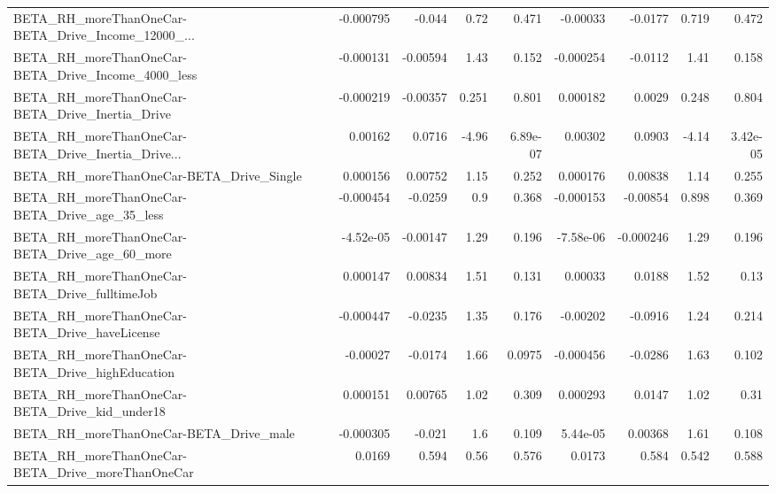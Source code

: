 \begin{tabular}{lrrrrrrrr}
BETA\_RH\_moreThanOneCar-BETA\_Drive\_Income\_12000\_... &   -0.000795 &       -0.044 &     0.72 &    0.471 &   -0.00033 &     -0.0177 &        0.719 &         0.472 \\
BETA\_RH\_moreThanOneCar-BETA\_Drive\_Income\_4000\_less &   -0.000131 &     -0.00594 &     1.43 &    0.152 &  -0.000254 &     -0.0112 &         1.41 &         0.158 \\
BETA\_RH\_moreThanOneCar-BETA\_Drive\_Inertia\_Drive    &   -0.000219 &     -0.00357 &    0.251 &    0.801 &   0.000182 &      0.0029 &        0.248 &         0.804 \\
BETA\_RH\_moreThanOneCar-BETA\_Drive\_Inertia\_Drive... &     0.00162 &       0.0716 &    -4.96 & 6.89e-07 &    0.00302 &      0.0903 &        -4.14 &      3.42e-05 \\
BETA\_RH\_moreThanOneCar-BETA\_Drive\_Single           &    0.000156 &      0.00752 &     1.15 &    0.252 &   0.000176 &     0.00838 &         1.14 &         0.255 \\
BETA\_RH\_moreThanOneCar-BETA\_Drive\_age\_35\_less      &   -0.000454 &      -0.0259 &      0.9 &    0.368 &  -0.000153 &    -0.00854 &        0.898 &         0.369 \\
BETA\_RH\_moreThanOneCar-BETA\_Drive\_age\_60\_more      &   -4.52e-05 &     -0.00147 &     1.29 &    0.196 &  -7.58e-06 &   -0.000246 &         1.29 &         0.196 \\
BETA\_RH\_moreThanOneCar-BETA\_Drive\_fulltimeJob      &    0.000147 &      0.00834 &     1.51 &    0.131 &    0.00033 &      0.0188 &         1.52 &          0.13 \\
BETA\_RH\_moreThanOneCar-BETA\_Drive\_haveLicense      &   -0.000447 &      -0.0235 &     1.35 &    0.176 &   -0.00202 &     -0.0916 &         1.24 &         0.214 \\
BETA\_RH\_moreThanOneCar-BETA\_Drive\_highEducation    &    -0.00027 &      -0.0174 &     1.66 &   0.0975 &  -0.000456 &     -0.0286 &         1.63 &         0.102 \\
BETA\_RH\_moreThanOneCar-BETA\_Drive\_kid\_under18      &    0.000151 &      0.00765 &     1.02 &    0.309 &   0.000293 &      0.0147 &         1.02 &          0.31 \\
BETA\_RH\_moreThanOneCar-BETA\_Drive\_male             &   -0.000305 &       -0.021 &      1.6 &    0.109 &   5.44e-05 &     0.00368 &         1.61 &         0.108 \\
BETA\_RH\_moreThanOneCar-BETA\_Drive\_moreThanOneCar   &      0.0169 &        0.594 &     0.56 &    0.576 &     0.0173 &       0.584 &        0.542 &         0.588 \\

\end{tabular}
